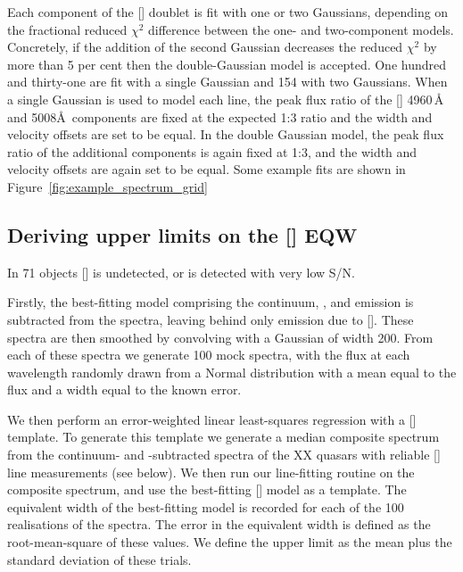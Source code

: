 Each component of the [] doublet is fit with one or two Gaussians, depending on the fractional reduced $\chi^2$ difference between the one- and two-component models. 
Concretely, if the addition of the second Gaussian decreases the reduced $\chi^2$ by more than 5 per cent then the double-Gaussian model is accepted.
One hundred and thirty-one are fit with a single Gaussian and 154 with two Gaussians. 
When a single Gaussian is used to model each line, the peak flux ratio of the [] 4960\,\AA\, and 5008\AA\, components are fixed at the expected 1:3 ratio and the width and velocity offsets are set to be equal.
In the double Gaussian model, the peak flux ratio of the additional components is again fixed at 1:3, and the width and velocity offsets are again set to be equal. 
Some example fits are shown in Figure~\ref{fig:example_spectrum_grid}

\subsection{Deriving upper limits on the [] \ac{EQW}}

In 71 objects [] is undetected, or is detected with very low \ac{S/N}. 

Firstly, the best-fitting model comprising the continuum, , and \hb emission is subtracted from the spectra, leaving behind only emission due to [].
These spectra are then smoothed by convolving with a Gaussian of width 200\kms. 
From each of these spectra we generate 100 mock spectra, with the flux at each wavelength randomly drawn from a Normal distribution with a mean equal to the flux and a width equal to the known error. 

We then perform an error-weighted linear least-squares regression with a [] template.
To generate this template we generate a median composite spectrum from the continuum- and -subtracted spectra of the XX quasars with reliable [] line measurements (see below).
We then run our line-fitting routine on the composite spectrum, and use the best-fitting [] model as a template. 
The equivalent width of the best-fitting model is recorded for each of the 100 realisations of the spectra. 
The error in the equivalent width is defined as the root-mean-square of these values.
We define the upper limit as the mean plus the standard deviation of these trials. 

